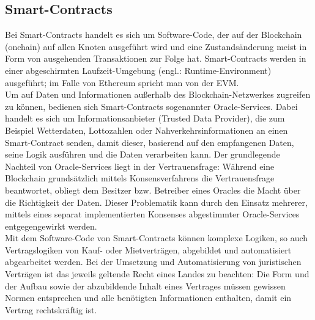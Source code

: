 \subsection{Smart-Contracts}
\label{subsec:fundamentals:dlt:smartcontracts}
Bei Smart-Contracts handelt es sich um Software-Code, der auf der Blockchain (onchain) auf allen Knoten ausgeführt wird und eine Zustandsänderung meist in Form von ausgehenden Transaktionen zur Folge hat. Smart-Contracts werden in einer abgeschirmten Laufzeit-Umgebung (engl.: Runtime-Environment) ausgeführt; im Falle von Ethereum spricht man von der \ac{EVM}. \cite{smartcontracts2017}\\
Um auf Daten und Informationen außerhalb des Blockchain-Netzwerkes zugreifen zu können, bedienen sich Smart-Contracts sogenannter Oracle-Services. Dabei handelt es sich um Informationsanbieter (Trusted Data Provider), die zum Beispiel Wetterdaten, Lottozahlen oder Nahverkehrsinformationen an einen Smart-Contract senden, damit dieser, basierend auf den empfangenen Daten, seine Logik ausführen und die Daten verarbeiten kann. Der grundlegende Nachteil von Oracle-Services liegt in der Vertrauensfrage: Während eine Blockchain grundsätzlich mittels Konsensverfahrens die Vertrauensfrage beantwortet, obliegt dem Besitzer bzw. Betreiber eines Oracles die Macht über die Richtigkeit der Daten. Dieser Problematik kann durch den Einsatz mehrerer, mittels eines separat implementierten Konsenses abgestimmter Oracle-Services entgegengewirkt werden. \cite{ORACLE2019}\\
Mit dem Software-Code von Smart-Contracts können komplexe Logiken, so auch Vertragslogiken von Kauf- oder Mietverträgen, abgebildet und automatisiert abgearbeitet werden. Bei der Umsetzung und Automatisierung von juristischen Verträgen ist das jeweils geltende Recht eines Landes zu beachten: Die Form und der Aufbau sowie der abzubildende Inhalt eines Vertrages müssen gewissen Normen entsprechen und alle benötigten Informationen enthalten, damit ein Vertrag rechtskräftig ist. \cite{smartcontracts2017}

